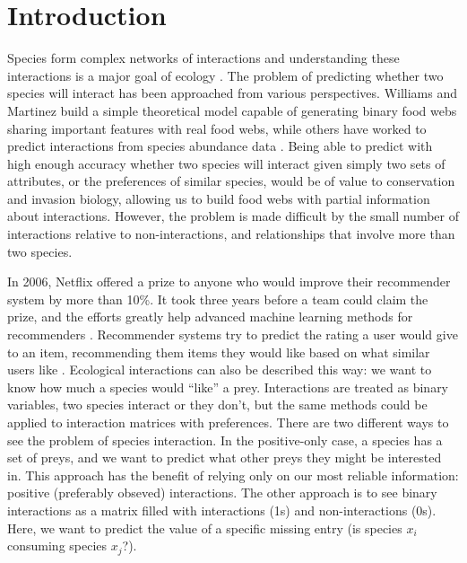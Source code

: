 \documentclass[letterpaper]{article}
\begin{document}
\section{Introduction}

Species form complex networks of interactions and understanding these
interactions is a major goal of ecology \cite{pim82}. The problem of predicting
whether two species will interact has been approached from various
perspectives. Williams and Martinez \cite{wil00} build a simple theoretical
model capable of generating binary food webs sharing important features with
real food webs, while others have worked to predict interactions from species
abundance data \cite{ade12}. Being able to predict with high enough accuracy
whether two species will interact given simply two sets of attributes, or the
preferences of similar species, would be of value to conservation and invasion
biology, allowing us to build food webs with partial information about
interactions. However, the problem is made difficult by the small number of
interactions relative to non-interactions, and relationships that involve more
than two species.

In 2006, Netflix offered a prize to anyone who would improve their recommender
system by more than 10\%. It took three years before a team could claim the
prize, and the efforts greatly help advanced machine learning methods for
recommenders \cite{mur12}. Recommender systems try to predict the rating a user
would give to an item, recommending them items they would like based on what
similar users like \cite{agg16}. Ecological interactions can also be described
this way: we want to know how much a species would ``like'' a prey.
Interactions are treated as binary variables, two species interact or they
don't, but the same methods could be applied to interaction matrices with
preferences. There are two different ways to see the problem of species
interaction. In the positive-only case, a species has a set of preys, and we
want to predict what other preys they might be interested in. This approach has
the benefit of relying only on our most reliable information: positive
(preferably obseved) interactions. The other approach is to see binary
interactions as a matrix filled with interactions (1s) and non-interactions
(0s). Here, we want to predict the value of a specific missing entry (is
species $x_i$ consuming species $x_j$?).
\end{document}
